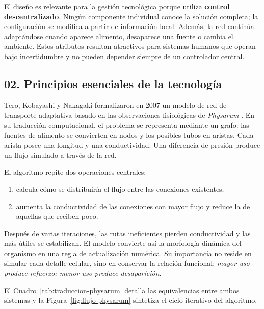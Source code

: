 \documentclass[11pt,letterpaper]{article}
\begin{document}
El diseño es relevante para la gestión tecnológica porque utiliza
\textbf{control descentralizado}. Ningún componente individual conoce la
solución completa; la configuración se modifica a partir de información local.
Además, la red continúa adaptándose cuando aparece alimento, desaparece una
fuente o cambia el ambiente. Estos atributos resultan atractivos para sistemas
humanos que operan bajo incertidumbre y no pueden depender siempre de un
controlador central.

\subsection*{02. Principios esenciales de la tecnología}

Tero, Kobayashi y Nakagaki formalizaron en 2007 un modelo de red de transporte
adaptativa basado en las observaciones fisiológicas de \emph{Physarum}
\parencite{tero2007}. En su traducción computacional, el problema se representa
mediante un grafo: las fuentes de alimento se convierten en nodos y los
posibles tubos en aristas. Cada arista posee una longitud y una conductividad.
Una diferencia de presión produce un flujo simulado a través de la red.

El algoritmo repite dos operaciones centrales:

\begin{enumerate}
  \item calcula cómo se distribuiría el flujo entre las conexiones existentes;
  \item aumenta la conductividad de las conexiones con mayor flujo y reduce la
    de aquellas que reciben poco.
\end{enumerate}

Después de varias iteraciones, las rutas ineficientes pierden conductividad y
las más útiles se estabilizan. El modelo convierte así la morfología dinámica
del organismo en una regla de actualización numérica. Su importancia no reside
en simular cada detalle celular, sino en conservar la relación funcional:
\emph{mayor uso produce refuerzo; menor uso produce desaparición}.

El Cuadro~\ref{tab:traduccion-physarum} detalla las equivalencias entre ambos
sistemas y la Figura~\ref{fig:flujo-physarum} sintetiza el ciclo iterativo del
algoritmo.
\end{document}
